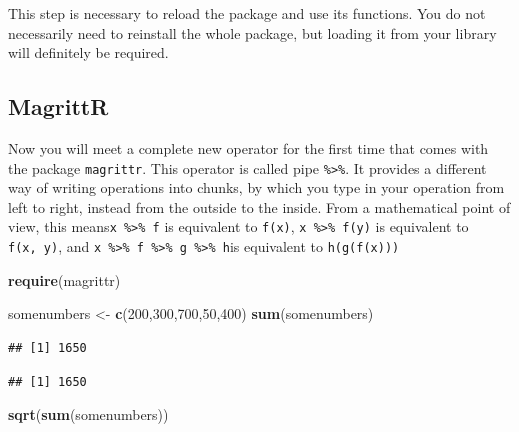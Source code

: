 \documentclass[]{report}
\newenvironment{Shaded}{\begin{snugshade}}{\end{snugshade}}
\newcommand{\KeywordTok}[1]{\textcolor[rgb]{0.13,0.29,0.53}{\textbf{#1}}}
\newcommand{\DecValTok}[1]{\textcolor[rgb]{0.00,0.00,0.81}{#1}}
\newcommand{\StringTok}[1]{\textcolor[rgb]{0.31,0.60,0.02}{#1}}
\newcommand{\OperatorTok}[1]{\textcolor[rgb]{0.81,0.36,0.00}{\textbf{#1}}}
\newcommand{\NormalTok}[1]{#1}
\begin{document}
This step is necessary to reload the package and use its functions. You
do not necessarily need to reinstall the whole package, but loading it
from your library will definitely be required.

\subsection{MagrittR}\label{magrittr}

Now you will meet a complete new operator for the first time that comes
with the package \texttt{magrittr}. This operator is called pipe
\texttt{\%\textgreater{}\%}. It provides a different way of writing
operations into chunks, by which you type in your operation from left to
right, instead from the outside to the inside. From a mathematical point
of view, this means\texttt{x\ \%\textgreater{}\%\ f} is equivalent to
\texttt{f(x)}, \texttt{x\ \%\textgreater{}\%\ f(y)} is equivalent to
\texttt{f(x,\ y)}, and
\texttt{x\ \%\textgreater{}\%\ f\ \%\textgreater{}\%\ g\ \%\textgreater{}\%\ h}is
equivalent to \texttt{h(g(f(x)))}

\begin{Shaded}
\begin{Highlighting}[]
\KeywordTok{require}\NormalTok{(magrittr)}

\NormalTok{somenumbers <-}\StringTok{ }\KeywordTok{c}\NormalTok{(}\DecValTok{200}\NormalTok{,}\DecValTok{300}\NormalTok{,}\DecValTok{700}\NormalTok{,}\DecValTok{50}\NormalTok{,}\DecValTok{400}\NormalTok{)}
\KeywordTok{sum}\NormalTok{(somenumbers)}
\end{Highlighting}
\end{Shaded}

\begin{verbatim}
## [1] 1650
\end{verbatim}

\begin{Shaded}
\end{Shaded}

\begin{verbatim}
## [1] 1650
\end{verbatim}

\begin{Shaded}
\begin{Highlighting}[]
\KeywordTok{sqrt}\NormalTok{(}\KeywordTok{sum}\NormalTok{(somenumbers))}
\end{Highlighting}
\end{Shaded}
\end{document}
